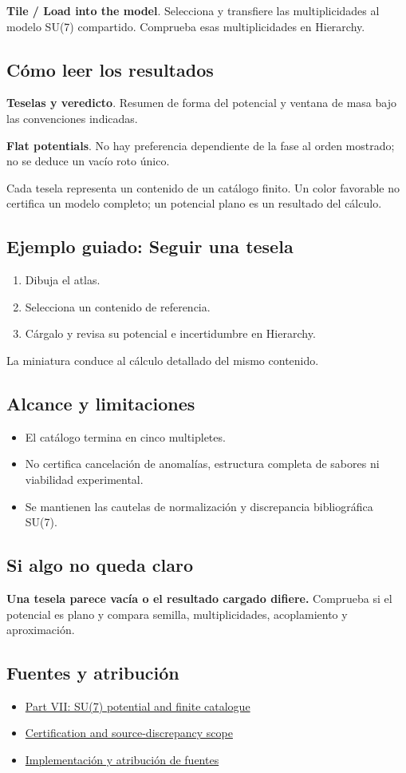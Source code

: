 \documentclass[11pt,a4paper]{article}
\begin{document}
\textbf{Tile / Load into the model}. Selecciona y transfiere las multiplicidades al modelo SU(7) compartido. Comprueba esas multiplicidades en Hierarchy.

\subsection*{Cómo leer los resultados}
\textbf{Teselas y veredicto}. Resumen de forma del potencial y ventana de masa bajo las convenciones indicadas.

\textbf{Flat potentials}. No hay preferencia dependiente de la fase al orden mostrado; no se deduce un vacío roto único.

Cada tesela representa un contenido de un catálogo finito. Un color favorable no certifica un modelo completo; un potencial plano es un resultado del cálculo.
\subsection*{Ejemplo guiado: Seguir una tesela}
\begin{enumerate}
\item Dibuja el atlas.
\item Selecciona un contenido de referencia.
\item Cárgalo y revisa su potencial e incertidumbre en Hierarchy.
\end{enumerate}
La miniatura conduce al cálculo detallado del mismo contenido.
\subsection*{Alcance y limitaciones}
\begin{itemize}
\item El catálogo termina en cinco multipletes.
\item No certifica cancelación de anomalías, estructura completa de sabores ni viabilidad experimental.
\item Se mantienen las cautelas de normalización y discrepancia bibliográfica SU(7).
\end{itemize}
\subsection*{Si algo no queda claro}
\textbf{Una tesela parece vacía o el resultado cargado difiere.} Comprueba si el potencial es plano y compara semilla, multiplicidades, acoplamiento y aproximación.

\subsection*{Fuentes y atribución}
\begin{itemize}
\item \href{https://karlesmarin.github.io/ghu-explorer/papers/part-vii/index.html}{Part VII: SU(7) potential and finite catalogue}
\item \href{https://karlesmarin.github.io/ghu-explorer/docs/su7-certification.html}{Certification and source-discrepancy scope}
\item \href{https://github.com/karlesmarin/ghu-lab/blob/main/src/sections/atlas_section.js}{Implementación y atribución de fuentes}
\end{itemize}
\end{document}
